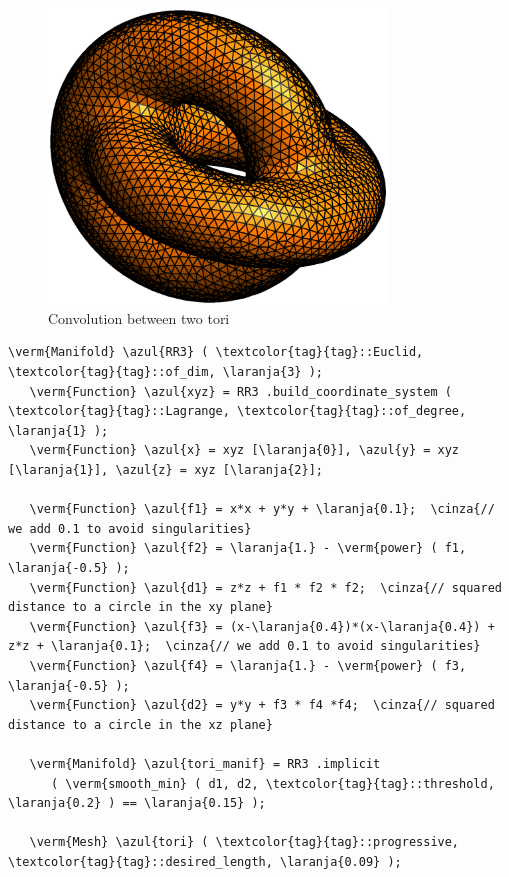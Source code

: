 \begin{figure}[ht] \centering
 \includegraphics[width=90mm]{two-tori}
  \caption{Convolution between two tori}
\end{figure}

\begin{Verbatim}[commandchars=\\\{\},formatcom=\small\tt,frame=single,
   label=parag-\ref{\numb section 3.\numb parag 7}.cpp,rulecolor=\color{coment},
   baselinestretch=0.94,framesep=2mm                                            ]
   \verm{Manifold} \azul{RR3} ( \textcolor{tag}{tag}::Euclid, \textcolor{tag}{tag}::of_dim, \laranja{3} );
   \verm{Function} \azul{xyz} = RR3 .build_coordinate_system ( \textcolor{tag}{tag}::Lagrange, \textcolor{tag}{tag}::of_degree, \laranja{1} );
   \verm{Function} \azul{x} = xyz [\laranja{0}], \azul{y} = xyz [\laranja{1}], \azul{z} = xyz [\laranja{2}];

   \verm{Function} \azul{f1} = x*x + y*y + \laranja{0.1};  \cinza{// we add 0.1 to avoid singularities}
   \verm{Function} \azul{f2} = \laranja{1.} - \verm{power} ( f1, \laranja{-0.5} );
   \verm{Function} \azul{d1} = z*z + f1 * f2 * f2;  \cinza{// squared distance to a circle in the xy plane}
   \verm{Function} \azul{f3} = (x-\laranja{0.4})*(x-\laranja{0.4}) + z*z + \laranja{0.1};  \cinza{// we add 0.1 to avoid singularities}
   \verm{Function} \azul{f4} = \laranja{1.} - \verm{power} ( f3, \laranja{-0.5} );
   \verm{Function} \azul{d2} = y*y + f3 * f4 *f4;  \cinza{// squared distance to a circle in the xz plane}

   \verm{Manifold} \azul{tori_manif} = RR3 .implicit
      ( \verm{smooth_min} ( d1, d2, \textcolor{tag}{tag}::threshold, \laranja{0.2} ) == \laranja{0.15} );

   \verm{Mesh} \azul{tori} ( \textcolor{tag}{tag}::progressive, \textcolor{tag}{tag}::desired_length, \laranja{0.09} );
\end{Verbatim}

